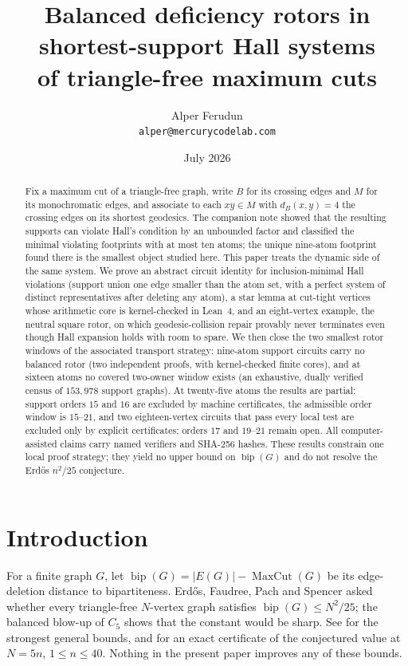\documentclass[11pt]{article}
\title{Balanced deficiency rotors in shortest-support Hall systems\\
of triangle-free maximum cuts}
\author{Alper Ferudun\\\texttt{alper@mercurycodelab.com}}
\date{July 2026}
\theoremstyle{definition}
\newcommand{\bip}{\operatorname{bip}}
\newcommand{\mc}{\operatorname{MaxCut}}
\begin{document}
\maketitle

\begin{abstract}
Fix a maximum cut of a triangle-free graph, write \(B\) for its
crossing edges and \(M\) for its monochromatic edges, and associate to
each \(xy\in M\) with \(d_B(x,y)=4\) the crossing edges on its shortest
geodesics. The companion note \cite{Ferudun26supports} showed that the
resulting supports can violate Hall's condition by an unbounded factor
and classified the minimal violating footprints with at most ten atoms;
the unique nine-atom footprint found there is the smallest object
studied here. This paper treats the dynamic side of the same system.
We prove an abstract circuit identity for inclusion-minimal Hall
violations (support union one edge smaller than the atom set, with a
perfect system of distinct representatives after deleting any atom), a
star lemma at cut-tight vertices whose arithmetic core is
kernel-checked in Lean~4, and an eight-vertex example, the neutral
square rotor, on which geodesic-collision repair provably never
terminates even though Hall expansion holds with room to spare. We then
close the two smallest rotor windows of the associated transport
strategy: nine-atom support circuits carry no balanced rotor (two
independent proofs, with kernel-checked finite cores), and at sixteen
atoms no covered two-owner window exists (an exhaustive, dually
verified census of \(153{,}978\) support graphs). At twenty-five atoms
the results are partial: support orders \(15\) and \(16\) are excluded
by machine certificates, the admissible order window is
\(15\)--\(21\), and two eighteen-vertex circuits that pass every local
test are excluded only by explicit certificates; orders \(17\) and
\(19\)--\(21\) remain open. All computer-assisted claims carry named
verifiers and SHA-256 hashes. These results constrain one local proof
strategy; they yield no upper bound on \(\bip(G)\) and do not resolve
the Erd\H{o}s \(n^2/25\) conjecture.
\end{abstract}

\section{Introduction}

For a finite graph \(G\), let \(\bip(G)=|E(G)|-\mc(G)\) be its
edge-deletion distance to bipartiteness. Erd\H{o}s, Faudree, Pach and
Spencer \cite{EFPS88} asked whether every triangle-free \(N\)-vertex
graph satisfies \(\bip(G)\le N^2/25\); the balanced blow-up of \(C_5\)
shows that the constant would be sharp. See \cite{EGS92,BCL21} for the
strongest general bounds, and \cite{Ferudun26} for an exact certificate
of the conjectured value at \(N=5n\), \(1\le n\le40\). Nothing in the
present paper improves any of these bounds.
\end{document}
